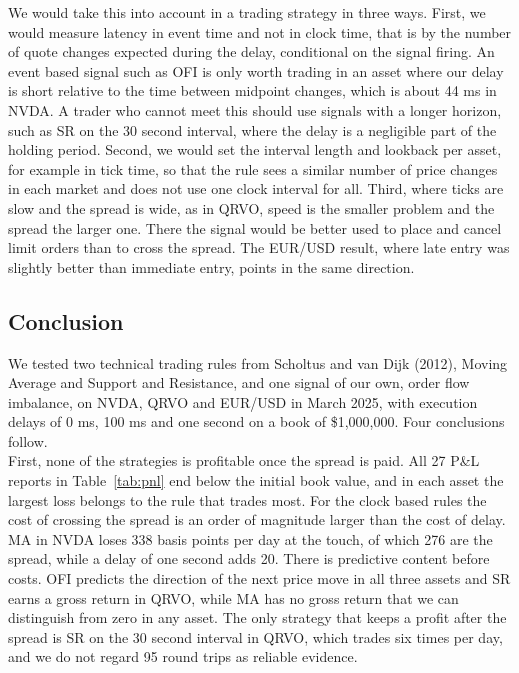 \documentclass{article}
\begin{document}
We would take this into account in a trading strategy in three ways. First, we would measure latency in event time and not in clock time, that is by the number of quote changes expected during the delay, conditional on the signal firing. An event based signal such as OFI is only worth trading in an asset where our delay is short relative to the time between midpoint changes, which is about 44 ms in NVDA. A trader who cannot meet this should use signals with a longer horizon, such as SR on the 30 second interval, where the delay is a negligible part of the holding period. Second, we would set the interval length and lookback per asset, for example in tick time, so that the rule sees a similar number of price changes in each market and does not use one clock interval for all. Third, where ticks are slow and the spread is wide, as in QRVO, speed is the smaller problem and the spread the larger one. There the signal would be better used to place and cancel limit orders than to cross the spread. The EUR/USD result, where late entry was slightly better than immediate entry, points in the same direction.

\subsection{Conclusion}

We tested two technical trading rules from Scholtus and van Dijk (2012), Moving Average and Support and Resistance, and one signal of our own, order flow imbalance, on NVDA, QRVO and EUR/USD in March 2025, with execution delays of 0 ms, 100 ms and one second on a book of \$1,000,000. Four conclusions follow.\\

\noindent First, none of the strategies is profitable once the spread is paid. All 27 P\&L reports in Table~\ref{tab:pnl} end below the initial book value, and in each asset the largest loss belongs to the rule that trades most. For the clock based rules the cost of crossing the spread is an order of magnitude larger than the cost of delay. MA in NVDA loses 338 basis points per day at the touch, of which 276 are the spread, while a delay of one second adds 20. There is predictive content before costs. OFI predicts the direction of the next price move in all three assets and SR earns a gross return in QRVO, while MA has no gross return that we can distinguish from zero in any asset. The only strategy that keeps a profit after the spread is SR on the 30 second interval in QRVO, which trades six times per day, and we do not regard 95 round trips as reliable evidence.\\
\end{document}
